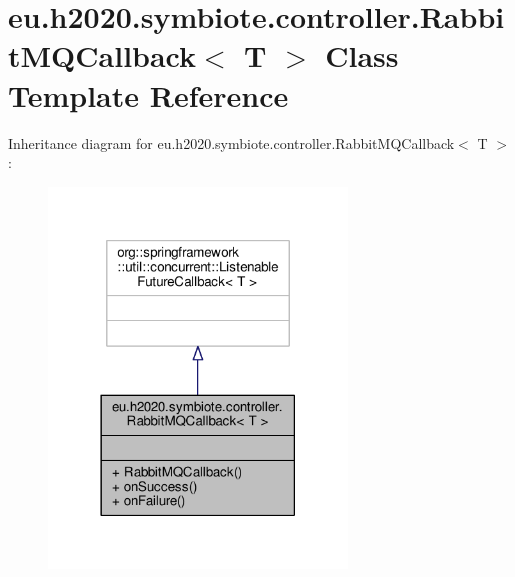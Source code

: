 \hypertarget{classeu_1_1h2020_1_1symbiote_1_1controller_1_1RabbitMQCallback}{}\section{eu.\+h2020.\+symbiote.\+controller.\+Rabbit\+M\+Q\+Callback$<$ T $>$ Class Template Reference}
\label{classeu_1_1h2020_1_1symbiote_1_1controller_1_1RabbitMQCallback}


Inheritance diagram for eu.\+h2020.\+symbiote.\+controller.\+Rabbit\+M\+Q\+Callback$<$ T $>$\+:
\nopagebreak
\begin{figure}[H]
\begin{center}
\leavevmode
\includegraphics[width=225pt]{classeu_1_1h2020_1_1symbiote_1_1controller_1_1RabbitMQCallback__inherit__graph}
\end{center}
\end{figure}


